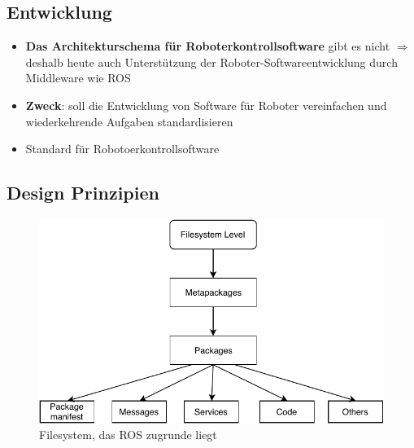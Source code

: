 \subsection{Entwicklung}
\begin{itemize}
	\item \textbf{Das Architekturschema für Roboterkontrollsoftware} gibt es nicht $\Rightarrow$ deshalb heute auch Unterstützung der Roboter-Softwareentwicklung durch Middleware wie ROS
	\item \textbf{Zweck}: soll die Entwicklung von Software für Roboter vereinfachen und wiederkehrende Aufgaben standardisieren
	\item Standard für Robotoerkontrollsoftware
\end{itemize}
\subsection{Design Prinzipien}
\begin{figure}[H]
	\begin{center}
		\includegraphics[]{Resources/PDF/FileSystem}
		\caption{Filesystem, das ROS zugrunde liegt}
		\label{fig:PDF/FileSystem}
	\end{center}
\end{figure}
